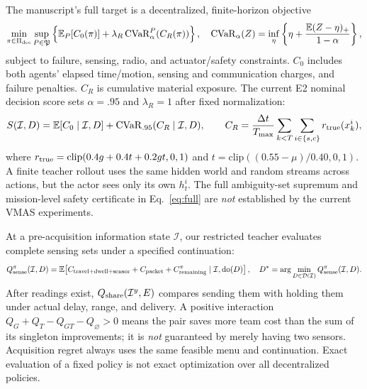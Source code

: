 \documentclass[10pt]{article}
\newcommand{\CVaR}{\operatorname{CVaR}}
\newcommand{\E}{\mathbb E}
\begin{document}
The manuscript's full target is a decentralized, finite-horizon objective
\begin{equation}
\min_{\pi\in\Pi_{\rm dec}}\sup_{P\in\mathfrak P}
\left\{\E_P[C_0(\pi)]+\lambda_R\CVaR^P_\alpha(C_R(\pi))\right\},
\quad
\CVaR_\alpha(Z)=\inf_\eta\left\{\eta+\frac{\E(Z-\eta)_+}{1-\alpha}\right\},
\label{eq:full}
\end{equation}
subject to failure, sensing, radio, and actuator/safety constraints. $C_0$
includes both agents' elapsed time/motion, sensing and communication charges,
and failure penalties. $C_R$ is cumulative material exposure. The current
E2 nominal decision score sets $\alpha=.95$ and $\lambda_R=1$ after fixed
normalization:
\begin{equation}
S(\mathcal I,D)=\E[C_0\mid\mathcal I,D]+\CVaR_{.95}(C_R\mid\mathcal I,D),\qquad
C_R=\frac{\Delta t}{T_{\max}}\sum_{k<T}\sum_{i\in\{s,c\}}r_{\rm true}(x^i_k),
\label{eq:e2score}
\end{equation}
where $r_{\rm true}=\mathrm{clip}(0.4g+0.4t+0.2gt,0,1)$ and
$t=\mathrm{clip}((0.55-\mu)/0.40,0,1)$. A finite teacher rollout uses the
same hidden world and random streams across actions, but the actor sees only
its own $h^i_t$. The full ambiguity-set supremum and mission-level safety
certificate in Eq.~\eqref{eq:full} are \emph{not} established by the current
VMAS experiments.

At a pre-acquisition information state $\mathcal I$, our restricted teacher
evaluates complete sensing sets under a specified continuation:
\begin{equation}
Q_{\rm sense}^{\pi}(\mathcal I,D)
=\E\!\left[C_{\rm travel+dwell+sensor}+C_{\rm packet}
 +C_{\rm remaining}^{\pi}\mid\mathcal I,\operatorname{do}(D)\right],\quad
D^*=\arg\min_{D\in\mathcal D(\mathcal I)}Q_{\rm sense}^{\pi}(\mathcal I,D).
\label{eq:qsense}
\end{equation}
After readings exist, $Q_{\rm share}(\mathcal I^y,E)$ compares sending them
with holding them under actual delay, range, and delivery. A positive
interaction
$Q_G+Q_T-Q_{GT}-Q_{\varnothing}>0$ means the pair saves more team cost than
the sum of its singleton improvements; it is \emph{not} guaranteed by merely
having two sensors. Acquisition regret always uses the same feasible menu and
continuation. Exact evaluation of a fixed policy is not exact optimization
over all decentralized policies.
\end{document}
